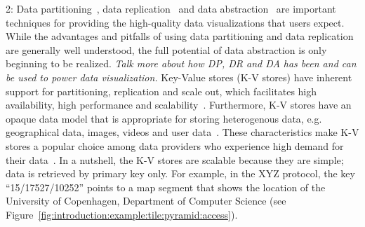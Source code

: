 \documentclass[11pt, oneside]{report}
\begin{document}

2: Data partitioning~\cite{datacenter:as:a:computer}, data replication~\cite{datacenter:as:a:computer} and data abstraction~\cite{mapgen, dbgen} are important techniques for providing the high-quality data visualizations that users expect. While the advantages and pitfalls of using data partitioning and data replication are generally well understood, the full potential of data abstraction is only beginning to be realized. \emph{Talk more about how DP, DR and DA has been and can be used to power data visualization.} Key-Value stores (K-V stores) have inherent support for partitioning, replication and scale out, which facilitates high availability, high performance and scalability~\cite{dynamodb, andfriends}. Furthermore, K-V stores have an opaque data model that is appropriate for storing heterogenous data, e.g. geographical data, images, videos and user data~\cite{usecase1, usecase2, usecase3, usecase4}. These characteristics make K-V stores a popular choice among data providers who experience high demand for their data~\cite{googlecdn, haystack}. In a nutshell, the K-V stores are scalable because they are simple; data is retrieved by primary key only. For example, in the XYZ protocol, the key ``15/17527/10252'' points to a map segment that shows the location of the University of Copenhagen, Department of Computer Science (see Figure~\ref{fig:introduction:example:tile:pyramid:access}). 

\end{document}
